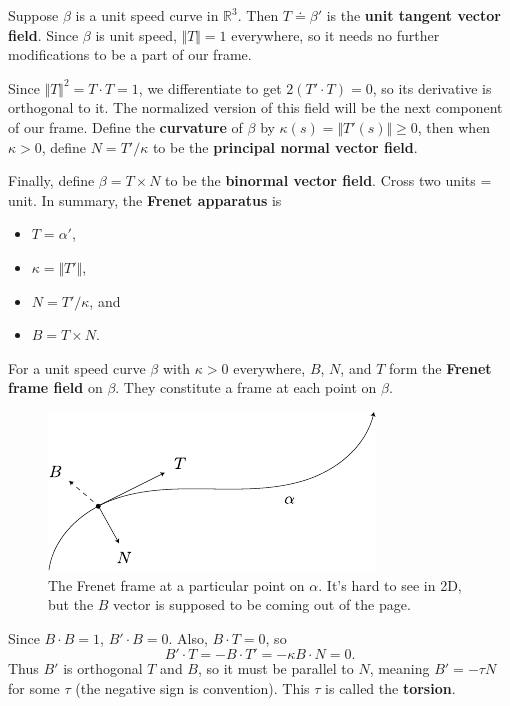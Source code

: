 \documentclass[10pt]{report}
\begin{document}
Suppose $\beta$ is a unit speed curve in $\mathbb{R}^3$. Then $T\doteq\beta'$ is the \textbf{unit tangent vector field}. Since $\beta$ is unit speed, $\Vert{T}\Vert=1$ everywhere, so it needs no further modifications to be a part of our frame.

Since $\Vert{T}\Vert^2 = T\cdot T=1$, we differentiate to get $2(T'\cdot T)=0$, so its derivative is orthogonal to it. The normalized version of this field will be the next component of our frame. Define the \textbf{curvature} of $\beta$ by $\kappa(s) = \Vert{T'(s)}\Vert\geq 0$, then when $\kappa > 0$, define $N = T' / \kappa$ to be the \textbf{principal normal vector field}.

Finally, define $\beta = T \times N$ to be the \textbf{binormal vector field}. {\color{red}Cross two units = unit.} In summary, the \textbf{Frenet apparatus} is
\begin{itemize}
	\item $T=\alpha'$,
	\item $\kappa = \Vert{T'}\Vert$,
	\item $N = T' / \kappa$, and
	\item $B = T \times N$.
\end{itemize}
\begin{defn}[]
	For a unit speed curve $\beta$ with $\kappa>0$ everywhere, $B$, $N$, and $T$ form the \textbf{Frenet frame field} on $\beta$. They constitute a frame at each point on $\beta$.
\end{defn}

\begin{figure}[H]
	\centering
	\includegraphics[scale=1.5]{fig/frenet.pdf}
	\caption{The Frenet frame at a particular point on $\alpha$. It's hard to see in 2D, but the $B$ vector is supposed to be coming out of the page.}
\end{figure}

Since $B \cdot B=1$, $B' \cdot B = 0$. Also, $B \cdot T = 0$, so
	\[
	B' \cdot T = -B \cdot T' = -\kappa B \cdot N = 0.
	\]
	Thus $B'$ is orthogonal $T$ and $B$, so it must be parallel to $N$, meaning $B' = -\tau N$ for some $\tau$ (the negative sign is convention). This $\tau$ is called the \textbf{torsion}.
\end{document}
